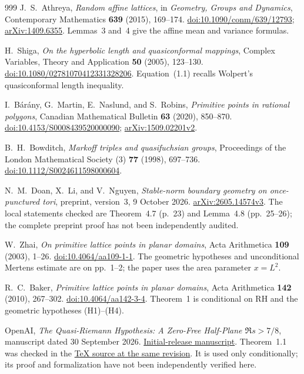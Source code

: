 \documentclass[11pt,a4paper]{article}
\numberwithin{equation}{section}
\theoremstyle{definition}
\theoremstyle{remark}
\begin{document}
\begin{thebibliography}{999}
J.~S.~Athreya,
\emph{Random affine lattices},
in \emph{Geometry, Groups and Dynamics},
Contemporary Mathematics \textbf{639} (2015), 169--174.
\href{https://doi.org/10.1090/conm/639/12793}{doi:10.1090/conm/639/12793};
\href{https://arxiv.org/abs/1409.6355}{arXiv:1409.6355}.
Lemmas~3 and~4 give the affine mean and variance formulas.

H.~Shiga,
\emph{On the hyperbolic length and quasiconformal mappings},
Complex Variables, Theory and Application \textbf{50} (2005), 123--130.
\href{https://doi.org/10.1080/02781070412331328206}{doi:10.1080/02781070412331328206}.
Equation~(1.1) recalls Wolpert's quasiconformal length inequality.


I.~B\'ar\'any, G.~Martin, E.~Naslund, and S.~Robins,
\emph{Primitive points in rational polygons},
Canadian Mathematical Bulletin \textbf{63} (2020), 850--870.
\href{https://doi.org/10.4153/S0008439520000090}{doi:10.4153/S0008439520000090};
\href{https://arxiv.org/abs/1509.02201v2}{arXiv:1509.02201v2}.

B.~H.~Bowditch,
\emph{Markoff triples and quasifuchsian groups},
Proceedings of the London Mathematical Society (3) \textbf{77} (1998), 697--736.
\href{https://doi.org/10.1112/S0024611598000604}{doi:10.1112/S0024611598000604}.

N.~M.~Doan, X.~Li, and V.~Nguyen,
\emph{Stable-norm boundary geometry on once-punctured tori},
preprint, version~3, 9 October 2026.
\href{https://arxiv.org/abs/2605.14574v3}{arXiv:2605.14574v3}.
The local statements checked are Theorem~4.7 (p.~23) and Lemma~4.8
(pp.~25--26); the complete preprint proof has not been independently audited.


W.~Zhai,
\emph{On primitive lattice points in planar domains},
Acta Arithmetica \textbf{109} (2003), 1--26.
\href{https://doi.org/10.4064/aa109-1-1}{doi:10.4064/aa109-1-1}.
The geometric hypotheses and unconditional Mertens estimate are on
pp.~1--2; the paper uses the area parameter $x=L^2$.

R.~C.~Baker,
\emph{Primitive lattice points in planar domains},
Acta Arithmetica \textbf{142} (2010), 267--302.
\href{https://doi.org/10.4064/aa142-3-4}{doi:10.4064/aa142-3-4}.
Theorem~1 is conditional on RH and the geometric hypotheses (H1)--(H4).

OpenAI,
\emph{The Quasi-Riemann Hypothesis: A Zero-Free Half-Plane
$\Re s>7/8$}, manuscript dated 30 September 2026.
\href{https://github.com/openai/math/blob/adc7f1241b42e322a6451854ab7e4b4c146bf78a/preprints/The-Quasi-Riemann-Hypothesis-September-30-2026/paper.pdf}{Initial-release manuscript}.
Theorem~1.1 was checked in the
\href{https://raw.githubusercontent.com/openai/math/adc7f1241b42e322a6451854ab7e4b4c146bf78a/preprints/The-Quasi-Riemann-Hypothesis-September-30-2026/build/paper.tex}{TeX source at the same revision}.
It is used only conditionally; its proof and formalization have not been
independently verified here.


\end{thebibliography}
\end{document}
